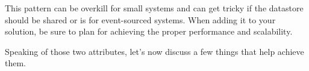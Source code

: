 This pattern can be overkill for small systems and can get tricky if the datastore should be shared or is for event-sourced systems. When adding it to your solution, be sure to plan for achieving the proper performance and scalability.

Speaking of those two attributes, let's now discuss a few things that help achieve them.















